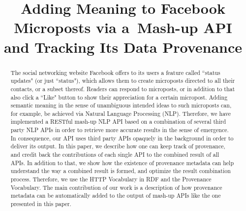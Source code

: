 \documentclass[conference]{IEEEtran}
\begin{document}
%
\title{Adding Meaning to Facebook Microposts via a~Mash-up API and Tracking Its Data Provenance}

\author{
\and
{}
\and
{}
}

\maketitle

\begin{abstract}
The social networking website Facebook offers to its users a feature called ``status updates" (or just ``status"), which allows them to create microposts directed to all their contacts, or a subset thereof. Readers can respond to microposts, or in addition to that also click a ``Like" button to show their appreciation for a certain micropost. Adding semantic meaning in the sense of unambiguous intended ideas to such microposts can, for example, be achieved via Natural Language Processing (NLP). Therefore, we have implemented a RESTful mash-up NLP API based on a combination of several third party NLP APIs in order to retrieve more accurate results in the sense of emergence. In consequence, our API uses third party APIs opaquely in the background in order to deliver its output. In this paper, we describe how one can keep track of provenance, and credit back the contributions of each single API to the combined result of all APIs. In addition to that, we show how the existence of provenance metadata can help understand the way a combined result is formed, and optimize the result combination process. Therefore, we use the HTTP Vocabulary in RDF and the Provenance Vocabulary. The main contribution of our work is a description of how provenance metadata can be automatically added to the output of mash-up APIs like the one presented in this paper.
\end{abstract}
\end{document}
